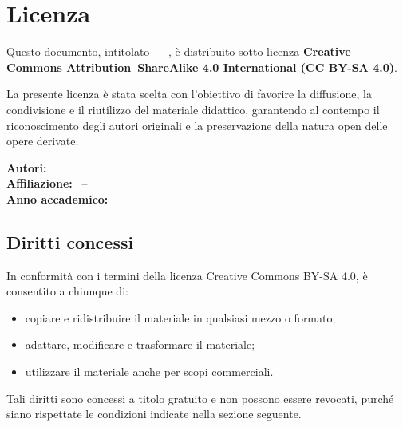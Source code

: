 \chapter*{Licenza}

\setlength{\parskip}{0.8em}
\setlength{\parindent}{0pt}

Questo documento, intitolato \emph{\BookTitle\ -- \BookSubtitle},
è distribuito sotto licenza \textbf{Creative Commons Attribution--ShareAlike 4.0
International (CC BY-SA 4.0)}.

\noindent
La presente licenza è stata scelta con l'obiettivo di favorire la diffusione,
la condivisione e il riutilizzo del materiale didattico, garantendo al contempo
il riconoscimento degli autori originali e la preservazione della natura open
delle opere derivate.

\vspace{0.6em}

\noindent
\sffamily\small\color{TextGray}
\textbf{Autori:} \BookAuthor \\
\textbf{Affiliazione:} \BookUni\ -- \BookDept \\
\textbf{Anno accademico:} \BookAY
\normalfont\normalsize\color{black}

\vspace{1em}

\section*{Diritti concessi}

In conformità con i termini della licenza Creative Commons BY-SA 4.0, è consentito
a chiunque di:
\begin{itemize}
  \item copiare e ridistribuire il materiale in qualsiasi mezzo o formato;
  \item adattare, modificare e trasformare il materiale;
  \item utilizzare il materiale anche per scopi commerciali.
\end{itemize}

Tali diritti sono concessi a titolo gratuito e non possono essere revocati,
purché siano rispettate le condizioni indicate nella sezione seguente.

\vspace{1em}

